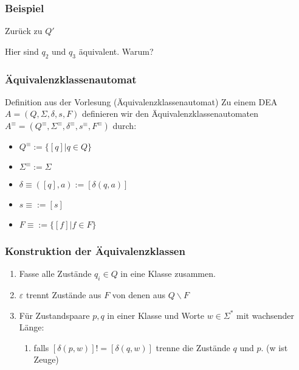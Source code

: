 \documentclass{beamer}
\begin{document}
{\begin{frame}
 \frametitle{Beispiel}
 \begin{block}{Zurück zu $Q'$}
 \begin{figure}[h]
\begin{center}
\end{center}
\end{figure}
Hier sind $q_2$ und $q_3$ äquivalent. Warum?
\end{block}
\end{frame}
\begin{frame}
 \frametitle{Äquivalenzklassenautomat}
 \begin{block}{Definition aus der Vorlesung (Äquivalenzklassenautomat)}
  Zu einem DEA \(A = (Q, \Sigma, \delta, s, F)\) definieren wir den Äquivalenzklassenautomaten 
  \(A^\equiv = (Q^\equiv, \Sigma^\equiv, \delta^\equiv, s^\equiv, F^\equiv)\) durch:
  \begin{itemize}
   \item $Q^\equiv := \{[q]|q\in Q\}$
   \item $\Sigma^\equiv := \Sigma$
   \item $\delta\equiv([q], a) := [\delta(q, a)]$
   \item $s\equiv := [s]$
   \item $F\equiv:= \{[f]|f\in F\}$
  \end{itemize}
 \end{block}
\end{frame}
\begin{frame}
 \frametitle{Konstruktion der Äquivalenzklassen}
 \begin{block}{}
  \begin{enumerate}
   \item Fasse alle Zustände $q_i \in Q$ in eine Klasse zusammen.
   \item $\varepsilon$ trennt Zustände aus $F$ von denen aus $Q \backslash F$
   \item Für Zustandspaare $p, q$ in einer Klasse und
   Worte $w\in \Sigma^*$ mit wachsender Länge: 
    \begin{enumerate}
    \item falls $[\delta(p, w)] != [\delta(q, w)]$ trenne die Zustände $q$ und $p$. (w ist Zeuge)

\end{enumerate}
\end{enumerate}
\end{block}
\end{frame}}
\end{document}
